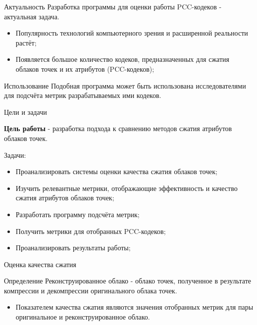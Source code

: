 \documentclass[aspectratio=169]{beamer}
\begin{document}
  \setcounter{framenumber}{2}

  \begin{frame}{Актуальность}
    Разработка программы для оценки работы PCC-кодеков - актуальная задача.

    \begin{itemize}
      \item Популярность технологий компьютерного зрения и расширенной
      реальности растёт;
      \item Появляется большое количество кодеков, предназначенных для сжатия
      облаков точек и их атрибутов (PCC-кодеков);
    \end{itemize}

    \begin{block}{Использование}
      Подобная программа может быть использована исследователями для подсчёта
      метрик разрабатываемых ими кодеков.
    \end{block}
  \end{frame}

  \begin{frame}{Цели и задачи}

  \textbf{Цель работы} - разработка подхода к сравнению методов сжатия атрибутов
  облаков точек.

  Задачи:

  \begin{itemize}
      \item Проанализировать системы оценки качества сжатия облаков точек;
      \item Изучить релевантные метрики, отображающие эффективность и качество
      сжатия атрибутов облаков точек;
      \item Разработать программу подсчёта метрик;
      \item Получить метрики для отобранных PCC-кодеков;
      \item Проанализировать результаты работы;
  \end{itemize}

  \end{frame}

  \begin{frame}{Оценка качества сжатия}
    \begin{block}{Определение}
      Реконструированное облако - облако точек, полученное в результате
      компрессии и декомпрессии оригинального облака точек.
    \end{block}

    \begin{itemize}
      \item Показателем качества сжатия являются значения отобранных метрик для
      пары оригинальное и реконструированное облако.
    \end{itemize}
  \end{frame}
\end{document}
